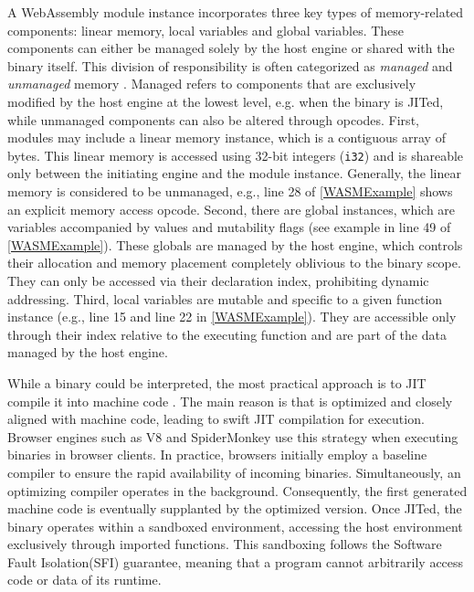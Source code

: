  A WebAssembly module instance incorporates three key types of memory-related components: linear memory, local variables and global variables. 
These components can either be managed solely by the host engine or shared with the \Wasm binary itself. 
This division of responsibility is often categorized as \emph{managed} and \emph{unmanaged} memory \cite{usenixWasm2020}. 
Managed refers to components that are exclusively modified by the host engine at the lowest level, e.g. when the \Wasm binary is JITed, while unmanaged components can also be altered through  \Wasm opcodes.
First, modules may include a linear memory instance, which is a contiguous array of bytes. 
This linear memory is accessed using 32-bit integers (\texttt{i32}) and is shareable only between the initiating engine and the \Wasm module instance. 
Generally, the linear memory is considered to be unmanaged, e.g., line 28 of \autoref{WASMExample} shows an explicit memory access opcode. 
Second, there are global instances, which are variables accompanied by values and mutability flags (see example in line 49 of \autoref{WASMExample}). 
These globals are managed by the host engine, which controls their allocation and memory placement completely oblivious to the \Wasm binary scope. 
They can only be accessed via their declaration index, prohibiting dynamic addressing. 
Third, local variables are mutable and specific to a given function instance (e.g., line 15 and line 22 in \autoref{WASMExample}). 
They are accessible only through their index relative to the executing function and are part of the data managed by the host engine.


While a \Wasm binary could be interpreted, the most practical approach is to JIT compile it into machine code \cite{2023arXiv230513241T}.
The main reason is that \Wasm is optimized and closely aligned with machine code, leading to swift JIT compilation for execution.
Browser engines such as V8 and SpiderMonkey use this strategy when executing \Wasm binaries in browser clients.
In practice, browsers initially employ a baseline compiler to ensure the rapid availability of incoming \Wasm binaries. 
Simultaneously, an optimizing compiler operates in the background. 
Consequently, the first generated machine code is eventually supplanted by the optimized version. 
Once JITed, the \Wasm binary operates within a sandboxed environment, accessing the host environment exclusively through imported functions.
This sandboxing follows the Software Fault Isolation(SFI) guarantee, meaning that a \Wasm program cannot arbitrarily access code or data of its runtime.  


